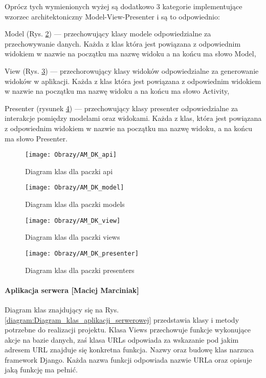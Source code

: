 Oprócz tych wymienionych wyżej są dodatkowo 3 kategorie implementujące wzorzec architektoniczny Model-View-Presenter i są to odpowiednio:
\begin{itemize*}
\item Model (Rys. \ref{Diagram klas dla paczki models}) 
--- przechowujący klasy modele odpowiedzialne za przechowywanie danych. Każda z klas która jest powiązana z odpowiednim widokiem   w nazwie na początku ma nazwę widoku a na końcu ma słowo Model,   
\item View 
(Rys. \ref{Diagram klas dla paczki views}) 
--- przechorowujący klasy widoków odpowiedzialne za generowanie widoków w aplikacji. Każda z klas która jest powiązana z odpowiednim widokiem   w nazwie na początku ma nazwę widoku a na końcu ma słowo Activity, 
\item Presenter
(rysunek \ref{Diagram klas dla paczki presenters}) 
--- przechowujący klasy presenter odpowiedzialne za interakcje pomiędzy modelami oraz widokami. Każda z klas, która jest powiązana z odpowiednim widokiem w nazwie na początku ma nazwę widoku, a na końcu ma słowo Presenter.\cite{And}
\end{itemize*}
\newpage
\begin{figure}[ht!]
	\centering
	\texttt{[image: Obrazy/AM\_DK\_api]}
	\caption{Diagram klas dla paczki api}
	\label{Diagram klas dla paczki api}
\end{figure}
\newpage

		\newpage
	\begin{figure}[ht!]
		\centering
		\texttt{[image: Obrazy/AM\_DK\_model]}
		\caption{Diagram klas dla paczki models}
		\label{Diagram klas dla paczki models}
	\end{figure}

	\newpage
\begin{figure}[ht!]
	\centering
	\texttt{[image: Obrazy/AM\_DK\_view]}
	\caption{Diagram klas dla paczki views}
	\label{Diagram klas dla paczki views}
\end{figure}
\newpage

		\begin{figure}[ht!]
			\centering
			\texttt{[image: Obrazy/AM\_DK\_presenter]}
			\caption{Diagram klas dla paczki presenters}
			\label{Diagram klas dla paczki presenters}
		\end{figure}
		\newpage		

	\paragraph*{Aplikacja serwera [Maciej Marciniak]}
	Diagram klas znajdujący się na Rys. \ref{diagram:Diagram_klas_aplikacji_serwerowej} przedstawia klasy i metody potrzebne do realizacji projektu. Klasa Views przechowuje funkcje wykonujące akcje na bazie danych, zaś klasa URLs odpowiada za wskazanie pod jakim adresem URL znajduje się konkretna funkcja. Nazwy oraz budowę klas narzuca framework Django. Każda nazwa funkcji odpowiada nazwie URLa oraz opisuje jaką funkcję ma pełnić.
	
